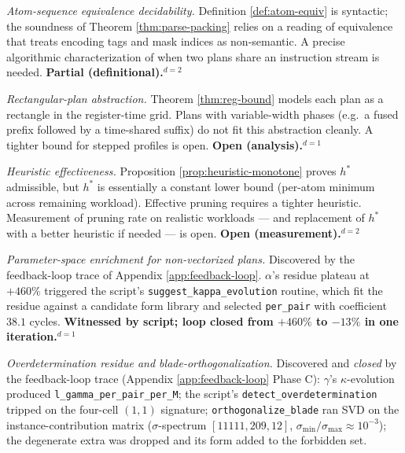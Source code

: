 \begin{description}[nosep,leftmargin=0.8cm]
  \item[G4] \emph{Atom-sequence equivalence decidability.}
    Definition \ref{def:atom-equiv} is syntactic; the
    soundness of Theorem \ref{thm:parse-packing} relies
    on a reading of equivalence that treats encoding
    tags and mask indices as non-semantic. A precise
    algorithmic characterization of when two plans
    share an instruction stream is needed.
    \textbf{Partial (definitional).}$^{d=2}$
  \item[G5] \emph{Rectangular-plan abstraction.}
    Theorem \ref{thm:reg-bound} models each plan as a
    rectangle in the register-time grid. Plans with
    variable-width phases (e.g.\ a fused prefix
    followed by a time-shared suffix) do not fit this
    abstraction cleanly. A tighter bound for stepped
    profiles is open.
    \textbf{Open (analysis).}$^{d=1}$
  \item[G6] \emph{Heuristic effectiveness.}
    Proposition \ref{prop:heuristic-monotone} proves
    $h^*$ admissible, but $h^*$ is essentially a
    constant lower bound (per-atom minimum across
    remaining workload). Effective pruning requires a
    tighter heuristic. Measurement of pruning rate on
    realistic workloads --- and replacement of $h^*$
    with a better heuristic if needed --- is open.
    \textbf{Open (measurement).}$^{d=2}$
  \item[G7] \emph{Parameter-space enrichment for
    non-vectorized plans.} Discovered by the
    feedback-loop trace of Appendix
    \ref{app:feedback-loop}. $\alpha$'s residue
    plateau at $+460\%$ triggered the script's
    \texttt{suggest\_kappa\_evolution} routine, which
    fit the residue against a candidate form library
    and selected \verb|per_pair| with coefficient
    $38.1$ cycles. \textbf{Witnessed by script; loop
    closed from $+460\%$ to $-13\%$ in one iteration.}$^{d=1}$
  \item[G8] \emph{Overdetermination residue and
    blade-orthogonalization.} Discovered and
    \emph{closed} by the feedback-loop trace (Appendix
    \ref{app:feedback-loop} Phase C): $\gamma$'s
    $\kappa$-evolution produced
    \verb|l_gamma_per_pair_per_M|; the script's
    \verb|detect_overdetermination| tripped on the
    four-cell $(1,1)$ signature;
    \verb|orthogonalize_blade| ran SVD on the
    instance-contribution matrix ($\sigma$-spectrum
    $[11111, 209, 12]$, $\sigma_{\min}/\sigma_{\max}
    \approx 10^{-3}$); the degenerate extra was
    dropped and its form added to the forbidden set.

\end{description}
